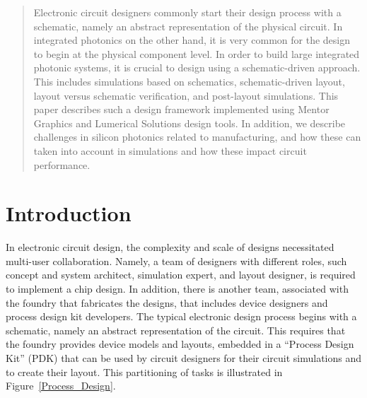 \documentclass[journal]{spie}
\begin{document}
\begin{abstract}

Electronic circuit designers commonly start their design process with a schematic, namely an abstract representation of the physical circuit.  In integrated photonics on the other hand, it is very common for the design to begin at the physical component level.  In order to build large integrated photonic systems, it is crucial to design using a schematic-driven approach.  This includes simulations based on schematics, schematic-driven layout, layout versus schematic verification, and post-layout simulations.   This paper  describes such a design framework implemented using Mentor Graphics and Lumerical Solutions design tools.  In addition, we describe challenges in silicon photonics related to manufacturing, and how these can taken into account in simulations and how these impact circuit performance.



\end{abstract}



\section{Introduction}\label{sec1}

In electronic circuit design, the complexity and scale of designs necessitated multi-user collaboration.  Namely, a team of designers with different roles, such concept and system architect, simulation expert, and layout designer, is required to implement a chip design.  In addition, there is another team, associated with the foundry that fabricates the designs, that includes device designers and process design kit developers.  The typical electronic design process begins with a schematic, namely an abstract representation of the circuit.  This requires that the foundry provides device models and layouts, embedded in a ``Process Design Kit'' (PDK) that can be used by circuit designers for their circuit simulations and to create their layout.  This partitioning of tasks is illustrated in Figure~\ref{Process_Design}.
\end{document}
